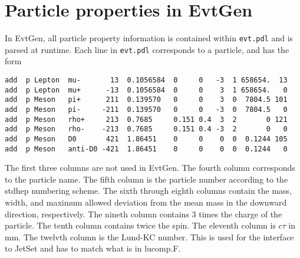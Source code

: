 \section{Particle properties in EvtGen}

\label{sect:pdttable}

In EvtGen, all particle property information is
contained within {\tt evt.pdl} and is parsed
at runtime.  Each line in {\tt evt.pdl} corresponds
to a particle, and has the form
\begin{verbatim}
add  p Lepton  mu-       13  0.1056584  0     0   -3  1 658654.  13
add  p Lepton  mu+      -13  0.1056584  0     0    3  1 658654.   0
add  p Meson   pi+      211  0.139570   0     0    3  0  7804.5 101
add  p Meson   pi-     -211  0.139570   0     0   -3  0  7804.5   0
add  p Meson   rho+     213  0.7685     0.151 0.4  3  2       0 121
add  p Meson   rho-    -213  0.7685     0.151 0.4 -3  2       0   0
add  p Meson   D0       421  1.86451    0     0    0  0  0.1244 105
add  p Meson   anti-D0 -421  1.86451    0     0    0  0  0.1244   0
\end{verbatim}
The first three columns are not used in EvtGen.  The fourth column
corresponds to the particle name.  The fifth column is the particle
number according to the stdhep numbering scheme.  
The sixth through eighth columns
contain the mass, width, and maximum allowed deviation from the mean mass
in the downward direction,
respectively.  The nineth column contains 3 times the charge of the particle.
The tenth column contains twice the spin.  The eleventh column is $c \tau$
in mm.  The twelvth column is the Lund-KC number. This is used for the
interface to JetSet and has to match what is in lucomp.F.
